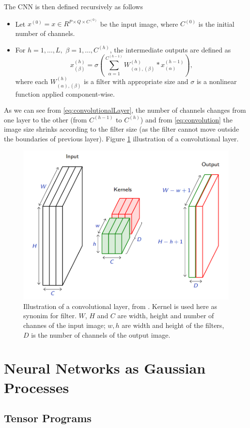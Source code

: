\documentclass[11pt,notitlepage]{article}
\numberwithin{equation}{section}
\theoremstyle{remark}
\theoremstyle{definition}
\begin{document}
	The CNN is then defined recursively as follows
	\begin{itemize}
		\item Let $x^{(0)} = x \in R^{P \times Q \times C^(0)}$ be the input image, where $C^{(0)}$ is the initial number of channels.
		\item For $h = 1, \dots , L,$ $\beta = 1, \dots , C^{(h)}$, the intermediate outputs are defined as
		\begin{equation}\label{eq:convolutionalLayer}
		x_{(\beta)}^{(h)} = \sigma\left(\sum_{\alpha=1}^{C^{(h-1)}} W^{(h)}_{(\alpha), (\beta)} * x^{(h-1)}_{(\alpha)}\right),
		\end{equation}
		where each $W^{(h)}_{(\alpha), (\beta)}$ is a filter with appropriate size and $\sigma$ is a nonlinear function applied component-wise.
	\end{itemize}
	As we can see from \eqref{eq:convolutionalLayer}, the number of channels changes from one layer to the other (from $C^{(h-1)}$ to $C^{(h)}$) and from \eqref{eq:convolution} the image size shrinks according to the filter size (as the filter cannot move outside the boundaries of previous layer).
	Figure \ref{fig:convolution} illustration of a convolutional layer.
	
	\begin{figure}
		\centering
		\includegraphics[width=.5\linewidth]{Figures/convolution.png}
		\caption{Illustration of a convolutional layer, from \cite{fleuret2019deep}. Kernel is used here as synonim for filter. $W$, $H$ and $C$ are width, height and number of channes of the input image; $w,h$ are width and height of the filters, $D$ is the number of channels of the output image.}
		\label{fig:convolution}
	\end{figure}
	\section{Neural Networks as Gaussian Processes}\label{sec:nnAsGaussianPr}
	
	\subsection{Tensor Programs}\label{subsec:tensorProg}
	
\end{document}
